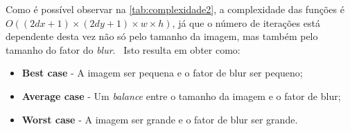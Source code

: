     \par Como é possível observar na \autoref{tab:complexidade2}, a complexidade das funções é $O((2dx + 1) \times (2dy + 1) \times w \times h)$, já que o número de iterações está dependente desta vez não só pelo tamanho da imagem, mas também pelo tamanho do fator do \textit{blur}. \ Isto resulta em obter como:

    \begin{itemize}
        \item \textbf{Best case} - A imagem ser pequena e o fator de blur ser pequeno;
        \item \textbf{Average case} - Um \textit{balance} entre o tamanho da imagem e o fator de blur;
        \item \textbf{Worst case} - A imagem ser grande e o fator de blur ser grande.
    \end{itemize}
